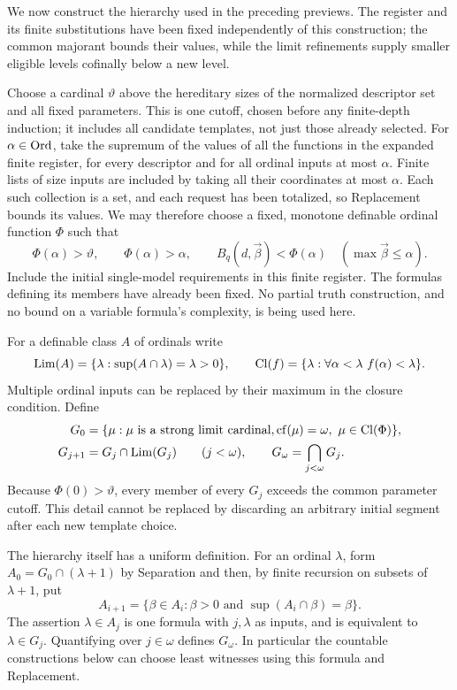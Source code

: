 We now construct the hierarchy used in the preceding previews.  The
register and its finite substitutions have been fixed independently of
this construction; the common majorant bounds their values, while the
limit refinements supply smaller eligible levels cofinally below a new
level.

Choose a cardinal $\vartheta$ above the hereditary sizes of the normalized
descriptor set and all fixed parameters.  This is one cutoff, chosen
before any finite-depth induction; it includes all candidate templates,
not just those already selected.  For $\alpha\in\operatorname{Ord}$, take the supremum
of the values of all the functions in the expanded finite register,
for every descriptor and for all ordinal inputs at most $\alpha$.
Finite lists of size inputs are included by taking all their coordinates
at most $\alpha$.  Each such collection is a set, and each request has
been totalized, so Replacement bounds its values.  We may therefore
choose a fixed, monotone definable ordinal function $\Phi$ such that
\[
 \Phi(\alpha)>\vartheta,\qquad \Phi(\alpha)>\alpha,
 \qquad B_q(d,\vec\beta)<\Phi(\alpha)
 \quad(\max\vec\beta\le\alpha).
\]
Include the initial single-model requirements in this finite register.
The formulas defining its members have already been fixed.  No partial
truth construction, and no bound on a variable formula's complexity,
is being used here.

For a definable class $A$ of ordinals write
\[
 \operatorname{Lim}(A)=\{\lambda:\sup(A\cap\lambda)=\lambda>0\},
 \qquad
 \operatorname{Cl}(f)=
 \{\lambda:\forall\alpha<\lambda\ f(\alpha)<\lambda\}.
\]
Multiple ordinal inputs can be replaced by their maximum in the closure
condition.  Define
\[
\begin{split}
G_0&=\{\mu:\mu\text{ is a strong limit cardinal},
                    \operatorname{cf}(\mu)=\omega,\ \mu\in\operatorname{Cl}(\Phi)\},\\
G_{j+1}&=G_j\cap\operatorname{Lim}(G_j)\qquad(j<\omega),\qquad
G_\omega=\bigcap_{j<\omega}G_j.
\end{split}
\]
Because $\Phi(0)>\vartheta$, every member of every $G_j$ exceeds the
common parameter cutoff.  This detail cannot be replaced by discarding
an arbitrary initial segment after each new template choice.

The hierarchy itself has a uniform definition.  For an ordinal $\lambda$,
form $A_0=G_0\cap(\lambda+1)$ by Separation and then, by finite recursion
on subsets of $\lambda+1$, put
\[
 A_{i+1}=\{\beta\in A_i:\beta>0\text{ and }
                                  \sup(A_i\cap\beta)=\beta\}.
\]
The assertion $\lambda\in A_j$ is one formula with $j,\lambda$ as inputs,
and is equivalent to $\lambda\in G_j$.  Quantifying over $j\in\omega$
defines $G_\omega$.  In particular the countable constructions below
can choose least witnesses using this formula and Replacement.

